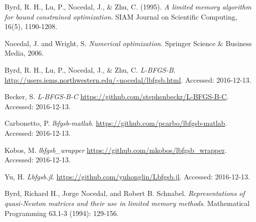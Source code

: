 \documentclass[11pt]{article}
\begin{document}
\begin{thebibliography}{99}

Byrd, R. H., Lu, P., Nocedal, J., \& Zhu, C. (1995).
\emph{A limited memory algorithm for bound constrained optimization}.
SIAM Journal on Scientific Computing, 16(5), 1190-1208.

Nocedal, J. and Wright, S.
\emph{Numerical optimization}. Springer Science \& Business Media, 2006.

Byrd, R. H., Lu, P., Nocedal, J., \& Zhu, C.
\emph{L-BFGS-B}.
\url{http://users.iems.northwestern.edu/~nocedal/lbfgsb.html}.
Accessed: 2016-12-13.

Becker, S.
\emph{L-BFGS-B-C}
\url{https://github.com/stephenbeckr/L-BFGS-B-C}.
Accessed: 2016-12-13.

Carbonetto, P.
\emph{lbfgsb-matlab}.
\url{https://github.com/pcarbo/lbfgsb-matlab}.
Accessed: 2016-12-13.

Kobos, M.
\emph{lbfgsb\_wrapper}
\url{https://github.com/mkobos/lbfgsb_wrapper}.
Accessed: 2016-12-13.

Yu, H.
\emph{Lbfgsb.jl}.
\url{https://github.com/yuhonglin/Lbfgsb.jl}.
Accessed: 2016-12-13.

Byrd, Richard H., Jorge Nocedal, and Robert B. Schnabel.
\emph{Representations of quasi-Newton matrices and their
use in limited memory methods}.
Mathematical Programming 63.1-3 (1994): 129-156.

\end{thebibliography}

\newpage
\end{document}
